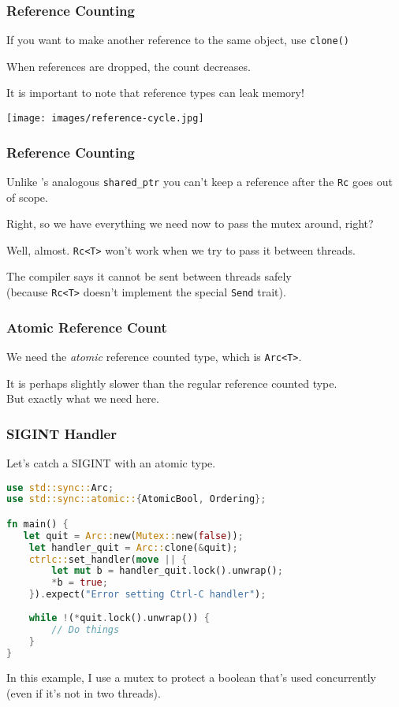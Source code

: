 \begin{frame}
\frametitle{Reference Counting}
If you want to make another reference to the same object, use \texttt{clone()}

When references are dropped, the count decreases.

It is important to note that reference types can leak memory!

\begin{center}
	\texttt{[image: images/reference-cycle.jpg]}
\end{center}

\end{frame}


\begin{frame}
\frametitle{Reference Counting}

Unlike \CPP's analogous \texttt{shared\_ptr} you can't keep a reference after the \texttt{Rc} goes out of scope.

Right, so we have everything we need now to pass the mutex around, right? 

Well, almost. \texttt{Rc<T>} won't work when we try to pass it between threads.

The compiler says it cannot be sent between threads safely \\
\hspace*{4em} (because \texttt{Rc<T>} doesn't implement the special \texttt{Send} trait). 

\end{frame}


\begin{frame}
\frametitle{Atomic Reference Count}

We need the \textit{atomic} reference counted type, which is \texttt{Arc<T>}. 

It is perhaps slightly slower than the regular reference counted type.\\
\quad But exactly what we need here.

\end{frame}


\begin{frame}[fragile]
\frametitle{SIGINT Handler}

Let's catch a SIGINT with an atomic type.

\begin{lstlisting}[language=Rust]
use std::sync::Arc;
use std::sync::atomic::{AtomicBool, Ordering};

fn main() {
   let quit = Arc::new(Mutex::new(false));
    let handler_quit = Arc::clone(&quit);
    ctrlc::set_handler(move || {
        let mut b = handler_quit.lock().unwrap();
        *b = true;
    }).expect("Error setting Ctrl-C handler");
 
    while !(*quit.lock().unwrap()) {
    	// Do things
    }
}
\end{lstlisting}

In this example, I use a mutex to protect a boolean that's used concurrently\\
\qquad (even if it's not in two threads).

\end{frame}

